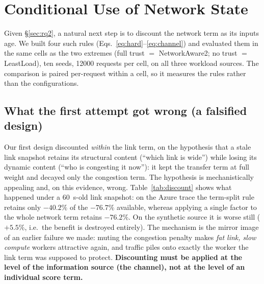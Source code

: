 \section{Conditional Use of Network State}
\label{sec:discount}

Given \S\ref{sec:rq2}, a natural next step is to discount the network term as its inputs age. We
built four such rules (Eqs.~\ref{eq:hard}--\ref{eq:channel}) and evaluated them in the same cells
as the two extremes (full trust $=$ NetworkAware2; no trust $=$ LeastLoad), ten seeds,
\num{12000} requests per cell, on all three workload sources. The comparison is paired
per-request within a cell, so it measures the rules rather than the configurations.

\subsection{What the first attempt got wrong (a falsified design)}
Our first design discounted \emph{within} the link term, on the hypothesis that a stale link
snapshot retains its structural content (``which link is wide'') while losing its dynamic content
(``who is congesting it now''): it kept the transfer term at full weight and decayed only the
congestion term. The hypothesis is mechanistically appealing and, on this evidence, wrong.
Table~\ref{tab:discount} shows what happened under a \SI{60}{\second}-old link snapshot: on the
Azure trace the term-split rule retains only $-40.2\%$ of the $-76.7\%$ available, whereas
applying a single factor to the whole network term retains $-76.2\%$. On the synthetic source it
is worse still ($+5.5\%$, i.e.~the benefit is destroyed entirely). The mechanism is the mirror
image of an earlier failure we made: muting the congestion penalty makes \emph{fat link, slow
compute} workers attractive again, and traffic piles onto exactly the worker the link term was
supposed to protect. \textbf{Discounting must be applied at the level of the information source
(the channel), not at the level of an individual score term.}

